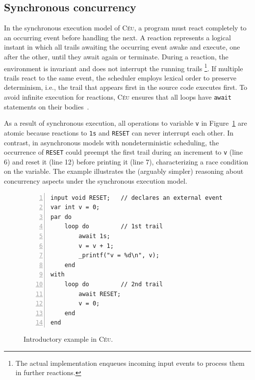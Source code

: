 \documentclass{acm_proc_article-sp}
\newcommand{\CEU}{\textsc{C\'{e}u}\xspace}
\newcommand{\code}[1] {{\small{\texttt{#1}}}}
\newcommand{\1}{\;}
\newcommand{\2}{\;\;}
\newcommand{\3}{\;\;\;}
\newcommand{\5}{\;\;\;\;\;}
\begin{document}
\subsection{Synchronous concurrency}
\label{sec.ceu.sync}

In the synchronous execution model of \CEU, a program must react completely to 
an occurring event before handling the next.
%
A reaction represents a logical instant in which all trails awaiting the 
occurring event awake and execute, one after the other, until they await again 
or terminate.
%
During a reaction, the environment is invariant and does not interrupt the 
running trails%
\footnote{
The actual implementation enqueues incoming input events to process them in 
further reactions.
}.
If multiple trails react to the same event, the scheduler employs lexical order 
to preserve determinism, i.e., the trail that appears first in the source code 
executes first.
%
To avoid infinite execution for reactions, \CEU ensures that all loops have 
\code{await} statements on their bodies~\cite{ceu.sensys13}.

As a result of synchronous execution, all operations to variable \code{v} in 
Figure~\ref{lst.intro} are atomic because reactions to \code{1s} and 
\code{RESET} can never interrupt each other.
%
In contrast, in asynchronous models with nondeterministic scheduling, the 
occurrence of \code{RESET} could preempt the first trail during an increment to 
\code{v} (line 6) and reset it (line 12) before printing it (line 7), 
characterizing a race condition on the variable.
%
The example illustrates the (arguably simpler) reasoning about concurrency 
aspects under the synchronous execution model.

\begin{figure}[t]
\begin{lstlisting}[numbers=left,xleftmargin=3em]
input void RESET;   // declares an external event
var int v = 0;
par do
    loop do         // 1st trail
        await 1s;
        v = v + 1;
        _printf("v = %d\n", v);
    end
with
    loop do         // 2nd trail
        await RESET;
        v = 0;
    end
end
\end{lstlisting}
\caption{ Introductory example in \CEU.
\label{lst.intro}
}
\end{figure}

\end{document}
